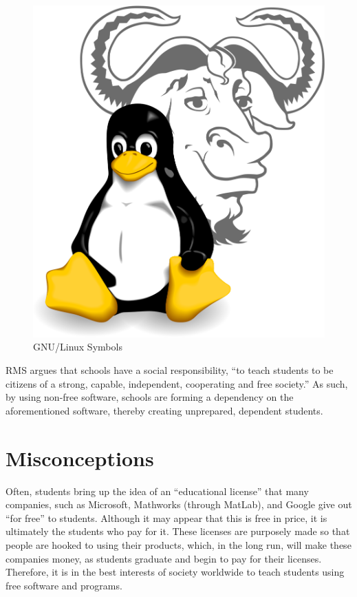 \documentclass[12pt]{article}
\begin{document}
\begin{multicols}{3}
  \begin{figure}
  \includegraphics[width=\linewidth]{Images/gnulinux.png}
  \caption{\tiny GNU/Linux Symbols}
  \end{figure}

RMS argues that schools have a social responsibility, “to teach students to be citizens of a strong, capable, independent, cooperating and free society.” As such, by using non-free software, schools are forming a dependency on the aforementioned software, thereby creating unprepared, dependent students. 

\section*{\small Misconceptions}

Often, students bring up the idea of an “educational license” that many companies, such as Microsoft, Mathworks (through MatLab), and Google give out “for free” to students. Although it may appear that this is free in price, it is ultimately the students who pay for it. These licenses are purposely made so that people are hooked to using their products, which, in the long run, will make these companies money, as students graduate and begin to pay for their licenses. Therefore, it is in the best interests of society worldwide to teach students using free software and programs. 

 \end{multicols}
\end{document}
